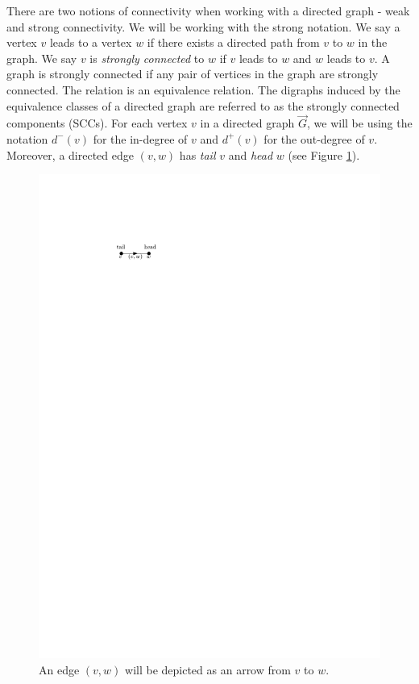 There are two notions of connectivity when working with a directed graph - weak and strong connectivity. We will be working with the strong notation. We say a vertex $v$ leads to a vertex $w$ if there exists a directed path from $v$ to $w$ in the graph. We say $v$ is \emph{strongly connected} to $w$ if $v$ leads to $w$ and $w$ leads to $v$. A graph is strongly connected if any pair of vertices in the graph are strongly connected. The relation is an equivalence relation. The digraphs induced by the equivalence classes of a directed graph are referred to as the strongly connected components (SCCs). For each vertex $v$ in a directed graph $\vec{G}$, we will be using the notation $d^-(v)$ for the in-degree of $v$ and $d^+(v)$ for the out-degree of $v$. Moreover, a directed edge $(v,w)$ has \emph{tail} $v$ and \emph{head} $w$ (see Figure \ref{fig.tailhead}).
\begin{figure}
    \centering
    \includegraphics{Content/Pictures/tail-head.pdf}
    \caption{An edge $(v,w)$ will be depicted as an arrow from $v$ to $w$.}\label{fig.tailhead}
\end{figure}


